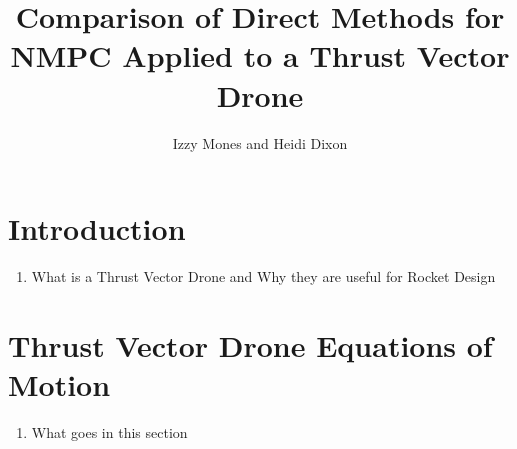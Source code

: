 \documentclass[]{article}
\title{Comparison of Direct Methods for NMPC  Applied to  a Thrust Vector Drone}
\author{Izzy Mones and Heidi Dixon}
\begin{document}
	\maketitle
	
	\section*{Introduction}	
	\begin{enumerate}
		\item What is a Thrust Vector Drone and Why they are useful for Rocket Design
	\end{enumerate}
	

	
	\section*{Thrust Vector Drone Equations of Motion}
	
	\begin{enumerate}
		\item What goes in this section
	\end{enumerate}	
	
\end{document}
